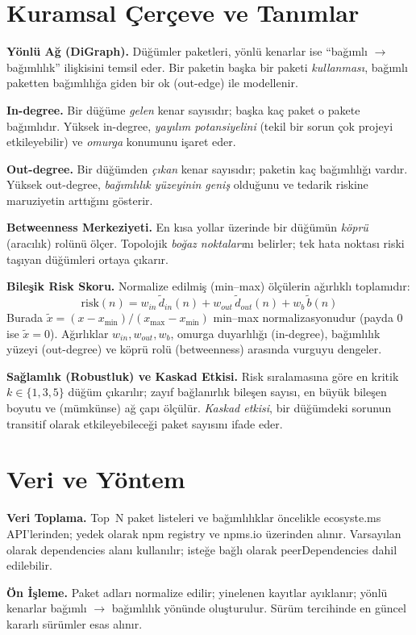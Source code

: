 \documentclass[11pt,a4paper]{article}
\begin{document}
\section{Kuramsal Çerçeve ve Tanımlar}
\textbf{Yönlü Ağ (DiGraph).} Düğümler paketleri, yönlü kenarlar ise ``bağımlı $\to$ bağımlılık'' ilişkisini temsil eder. Bir paketin başka bir paketi \emph{kullanması}, bağımlı paketten bağımlılığa giden bir ok (out-edge) ile modellenir.

\textbf{In-degree.} Bir düğüme \emph{gelen} kenar sayısıdır; başka kaç paket o pakete bağımlıdır. Yüksek in-degree, \emph{yayılım potansiyelini} (tekil bir sorun çok projeyi etkileyebilir) ve \emph{omurga} konumunu işaret eder.

\textbf{Out-degree.} Bir düğümden \emph{çıkan} kenar sayısıdır; paketin kaç bağımlılığı vardır. Yüksek out-degree, \emph{bağımlılık yüzeyinin geniş} olduğunu ve tedarik riskine maruziyetin arttığını gösterir.

\textbf{Betweenness Merkeziyeti.} En kısa yollar üzerinde bir düğümün \emph{köprü} (aracılık) rolünü ölçer. Topolojik \emph{boğaz noktaları}nı belirler; tek hata noktası riski taşıyan düğümleri ortaya çıkarır.

\textbf{Bileşik Risk Skoru.} Normalize edilmiş (min--max) ölçülerin ağırlıklı toplamıdır:
\[\mathrm{risk}(n) = w_{in}\,\tilde d_{in}(n) + w_{out}\,\tilde d_{out}(n) + w_b\,\tilde b(n)\]
Burada $\tilde x = (x - x_{\min})/(x_{\max}-x_{\min})$ min--max normalizasyonudur (payda 0 ise $\tilde x=0$). Ağırlıklar $w_{in}, w_{out}, w_b$, omurga duyarlılığı (in-degree), bağımlılık yüzeyi (out-degree) ve köprü rolü (betweenness) arasında vurguyu dengeler.

\textbf{Sağlamlık (Robustluk) ve Kaskad Etkisi.} Risk sıralamasına göre en kritik $k\in\{1,3,5\}$ düğüm çıkarılır; zayıf bağlanırlık bileşen sayısı, en büyük bileşen boyutu ve (mümkünse) ağ çapı ölçülür. \emph{Kaskad etkisi}, bir düğümdeki sorunun transitif olarak etkileyebileceği paket sayısını ifade eder.

\section{Veri ve Yöntem}
\textbf{Veri Toplama.} Top~N paket listeleri ve bağımlılıklar öncelikle ecosyste.ms API’lerinden; yedek olarak npm registry ve npms.io üzerinden alınır. Varsayılan olarak dependencies alanı kullanılır; isteğe bağlı olarak peerDependencies dahil edilebilir.

\textbf{Ön İşleme.} Paket adları normalize edilir; yinelenen kayıtlar ayıklanır; yönlü kenarlar bağımlı $\to$ bağımlılık yönünde oluşturulur. Sürüm tercihinde en güncel kararlı sürümler esas alınır.
\end{document}
